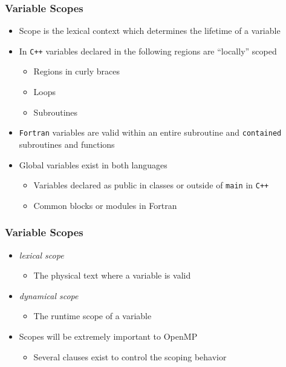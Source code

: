 \documentclass[xcolor=table,10pt,final]{beamer}
\begin{document}
\begin{frame}
  \frametitle{Variable Scopes}
  \begin{itemize}
    \itemsep 0.5cm
    \item Scope is the lexical context which determines the lifetime of a variable
    \item In {\tt C++} variables declared in the following regions are ``locally'' scoped
      \begin{itemize}
	\item Regions in curly braces
	\item Loops
	\item Subroutines
      \end{itemize}
    \item {\tt Fortran} variables are valid within an entire subroutine and {\tt contained} subroutines and functions
    \item Global variables exist in both languages
      \begin{itemize}
	\item Variables declared as public in classes or outside of {\tt main} in {\tt C++}
	\item Common blocks or modules in Fortran
      \end{itemize}
  \end{itemize}
\end{frame}

\begin{frame}
  \frametitle{Variable Scopes}
  \begin{itemize}
    \itemsep 0.5cm
    \item \emph{lexical scope}
      \begin{itemize}
	\item The physical text where a variable is valid
      \end{itemize}
    \item \emph{dynamical scope}
      \begin{itemize}
	\item The runtime scope of a variable
      \end{itemize}
    \item Scopes will be extremely important to OpenMP
      \begin{itemize}
	\item Several clauses exist to control the scoping behavior
      \end{itemize}
  \end{itemize}
\end{frame}
\end{document}
